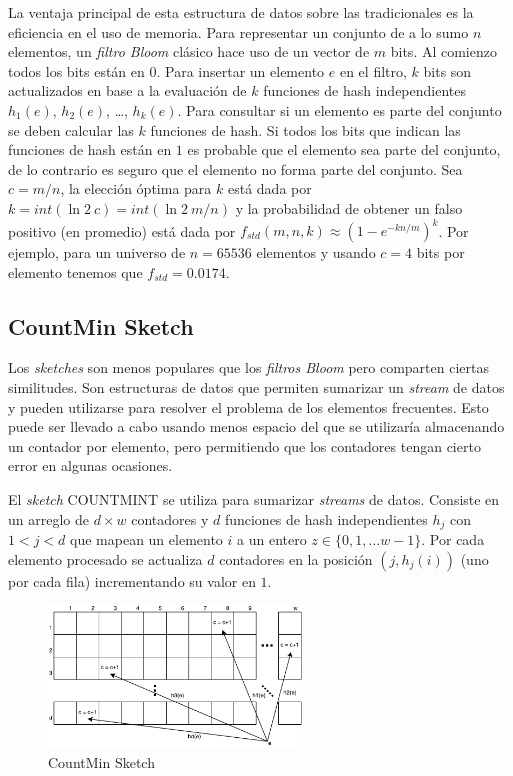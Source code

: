 \documentclass[a4paper,10pt, oneside]{article}
\begin{document}
La ventaja principal de esta estructura de datos sobre las tradicionales es la eficiencia en el uso de memoria. Para representar un conjunto de a lo sumo $n$ elementos, un \textit{filtro Bloom} clásico hace uso de un vector de $m$ bits. Al comienzo todos los bits están en $0$. Para insertar un elemento $e$ en el filtro, $k$ bits son actualizados en base a la evaluación de $k$ funciones de hash independientes $h_1(e)$, $h_2(e)$, \dots, $h_k(e)$. Para consultar si un elemento es parte del conjunto se deben calcular las $k$ funciones de hash. Si todos los bits que indican las funciones de hash están en $1$ es probable que el elemento sea parte del conjunto, de lo contrario es seguro que el elemento no forma parte del conjunto. Sea $c=m/n$, la elección óptima para $k$ está dada por $k=int(\ln 2 \ c) = int(\ln 2 \ m/n)$ y la probabilidad de obtener un falso positivo (en promedio) está dada por $f_{std} (m,n,k) \approx (1-e^{-kn/m})^k$\cite{Bloom:1970:STH:362686.362692}. Por ejemplo, para un universo de $n=65536$ elementos y usando $c=4$ bits por elemento tenemos que $f_{std}=0.0174$.


\subsection{CountMin Sketch}

Los \textit{sketches} son menos populares que los \textit{filtros Bloom} pero comparten ciertas similitudes. Son estructuras de datos que permiten sumarizar un \textit{stream} de datos y pueden utilizarse para resolver el problema de los elementos frecuentes. Esto puede ser llevado a cabo usando menos espacio del que se utilizaría almacenando un contador por elemento, pero permitiendo que los contadores tengan cierto error en algunas ocasiones.

El \textit{sketch} COUNTMINT\cite{Cormode:2005:IDS:1073713.1073718} se utiliza para sumarizar \textit{streams} de datos. Consiste en un arreglo de $d \times w$ contadores y $d$ funciones de hash independientes $h_j$ con $1<j<d$ que mapean un elemento $i$ a un entero $z \in \{0, 1, \dots w-1\}$. Por cada elemento procesado se actualiza $d$ contadores en la posición $(j,h_j(i))$ (uno por cada fila) incrementando su valor en $1$.

\begin{figure}[htbp]
	\centering
	\includegraphics[width=0.6\textwidth]{graph/cmSketch.pdf}
	\caption{CountMin Sketch}
	\label{fig:cmSketch}
\end{figure}
\end{document}
